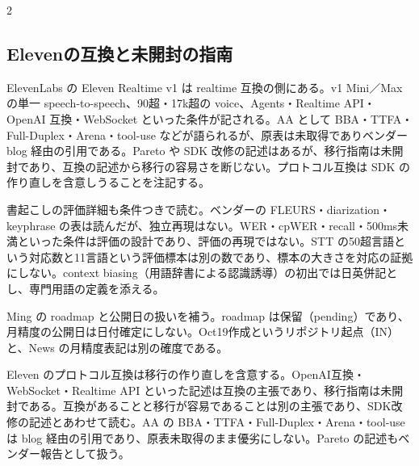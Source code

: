 \documentclass[lualatex,a4paper,10pt]{jlreq}
\begin{document}
\begin{multicols}{2} %


\subsection*{Elevenの互換と未開封の指南}


ElevenLabs の Eleven Realtime v1 は realtime 互換の側にある。v1 Mini／Max の単一 speech-to-speech、90超・17k超の voice、Agents・Realtime API・OpenAI 互換・WebSocket といった条件が記される。AA として BBA・TTFA・Full-Duplex・Arena・tool-use などが語られるが、原表は未取得でありベンダー blog 経由の引用である。Pareto や SDK 改修の記述はあるが、移行指南は未開封であり、互換の記述から移行の容易さを断じない。プロトコル互換は SDK の作り直しを含意しうることを注記する。


書起こしの評価詳細も条件つきで読む。ベンダーの FLEURS・diarization・keyphrase の表は読んだが、独立再現はない。WER・cpWER・recall・500ms未満といった条件は評価の設計であり、評価の再現ではない。STT の50超言語という対応数と11言語という評価標本は別の数であり、標本の大きさを対応の証拠にしない。context biasing（用語辞書による認識誘導）の初出では日英併記とし、専門用語の定義を添える。


Ming の roadmap と公開日の扱いを補う。roadmap は保留（pending）であり、月精度の公開日は日付確定にしない。Oct19作成というリポジトリ起点（IN）と、News の月精度表記は別の確度である。


Eleven のプロトコル互換は移行の作り直しを含意する。OpenAI互換・WebSocket・Realtime API といった記述は互換の主張であり、移行指南は未開封である。互換があることと移行が容易であることは別の主張であり、SDK改修の記述とあわせて読む。AA の BBA・TTFA・Full-Duplex・Arena・tool-use は blog 経由の引用であり、原表未取得のまま優劣にしない。Pareto の記述もベンダー報告として扱う。


\end{multicols} %
\end{document}
